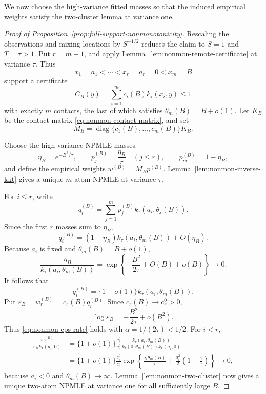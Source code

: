 We now choose the high-variance fitted masses so that the induced empirical
weights satisfy the two-cluster lemma at variance one.
\begin{proof}[Proof of Proposition~\ref{prop:full-support-nonmonotonicity}]
Rescaling the observations and mixing locations by \(S^{-1/2}\) reduces the
claim to \(S=1\) and \(T=\tau>1\). Put \(r=m-1\), and apply
Lemma~\ref{lem:nonmon-remote-certificate} at variance \(\tau\). Thus
\[
    x_1=a_1<\cdots<x_r=a_r=0<x_m=B
\]
support a certificate
\[
    C_B(y)=\sum_{i=1}^mc_i(B)k_\tau(x_i,y)\le1
\]
with exactly \(m\) contacts, the last of which satisfies
\(\theta_m(B)=B+o(1)\). Let \(K_B\) be the contact matrix
\eqref{eq:nonmon-contact-matrix}, and set
\[
    M_B=\operatorname{diag}\{c_1(B),\ldots,c_m(B)\}K_B.
\]

Choose the high-variance NPMLE masses
\[
    \eta_B=e^{-B^2/\tau},
    \qquad
    p_j^{(B)}=\frac{\eta_B}{r}\quad(j\le r),
    \qquad
    p_m^{(B)}=1-\eta_B,
\]
and define the empirical weights \(w^{(B)}=M_Bp^{(B)}\).
Lemma~\ref{lem:nonmon-inverse-kkt} gives a unique \(m\)-atom NPMLE at
variance \(\tau\).

For \(i\le r\), write
\[
    q_i^{(B)}
    =
    \sum_{j=1}^mp_j^{(B)}k_\tau(a_i,\theta_j(B)).
\]
Since the first \(r\) masses sum to \(\eta_B\),
\[
    q_i^{(B)}
    =
    (1-\eta_B)k_\tau(a_i,\theta_m(B))+O(\eta_B).
\]
Because \(a_i\) is fixed and \(\theta_m(B)=B+o(1)\),
\[
    \frac{\eta_B}{k_\tau(a_i,\theta_m(B))}
    =
    \exp\left\{-\frac{B^2}{2\tau}+O(B)+o(B)\right\}
    \longrightarrow0.
\]
It follows that
\begin{equation}
\label{eq:nonmon-q-dominance}
    q_i^{(B)}
    =
    \{1+o(1)\}k_\tau(a_i,\theta_m(B)).
\end{equation}
Put \(\varepsilon_B=w_r^{(B)}=c_r(B)q_r^{(B)}\). Since
\(c_r(B)\to c_r^0>0\),
\[
    \log\varepsilon_B
    =
    -\frac{B^2}{2\tau}+o(B^2).
\]
Thus \eqref{eq:nonmon-eps-rate} holds with
\(\alpha=1/(2\tau)<1/2\). For \(i<r\),
\begin{align*}
    \frac{w_i^{(B)}}{\varepsilon_Bk_1(a_i,0)}
    &=
    \{1+o(1)\}\frac{c_i^0}{c_r^0}
    \frac{k_\tau(a_i,\theta_m(B))}
         {k_\tau(0,\theta_m(B))k_1(a_i,0)}\\
    &=
    \{1+o(1)\}\frac{c_i^0}{c_r^0}
    \exp\left\{
        \frac{a_i\theta_m(B)}{\tau}
        +\frac{a_i^2}{2}\left(1-\frac1\tau\right)
    \right\}
    \longrightarrow0,
\end{align*}
because \(a_i<0\) and \(\theta_m(B)\to\infty\).
Lemma~\ref{lem:nonmon-two-cluster} now gives a unique two-atom NPMLE at
variance one for all sufficiently large \(B\).


\end{proof}
